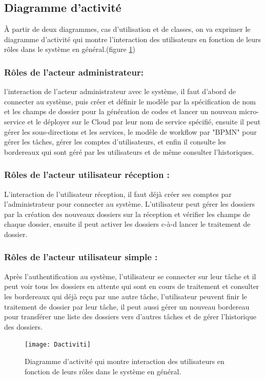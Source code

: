\subsection{Diagramme d'activité  }

À partir de deux diagrammes, cas d'utilisation et de classes,  on va exprimer  le diagramme d'activité qui  montre l'interaction des  utilisateurs   en fonction de leurs rôles dans le système en général.(figure \ref{fig:dactiviti})

\subsubsection{Rôles de l'acteur administrateur: }
l'interaction de l'acteur administrateur avec le système, il faut d'abord de connecter au système, puis créer et définir le modèle par la spécification de nom et les champs de dossier pour la génération de codes et lancer un nouveau micro-service et le déployer sur le Cloud par leur nom de service spécifié, ensuite il peut gérer les sous-directions et les services, le modèle de workflow par "BPMN" pour gérer les tâches, gérer les comptes d'utilisateurs, et enfin il  consulte les bordereaux qui sont géré par les utilisateurs et de même consulter l'historiques.
\subsubsection{Rôles de l'acteur utilisateur réception : }
L'interaction de l'utilisateur réception, il faut déjà créer ses comptes par l'administrateur pour connecter au système.  L'utilisateur peut gérer les dossiers par la création des nouveaux dossiers sur la réception et vérifier les champs de chaque dossier, ensuite il peut activer les dossiers c-à-d lancer le  traitement de dossier.

\subsubsection{Rôles de l'acteur utilisateur simple : } 
Après l'authentification au système,  l'utilisateur se connecter sur leur tâche et il peut voir tous les dossiers en attente qui sont en cours de traitement et consulter les bordereaux qui déjà reçu par une autre tâche, l'utilisateur peuvent finir le traitement de dossier par leur tâche, il peut aussi gérer un nouveau bordereau pour transférer une liste des dossiers vers d'autres tâches et de gérer l'historique des dossiers.
   
   \begin{figure}[H]
   	\centering
   	\texttt{[image: Dactiviti]}
   	\caption{Diagramme d'activité qui  montre interaction des  utilisateurs   en fonction de leurs rôles dans le système en général.}
   	\label{fig:dactiviti}
   \end{figure}
     
